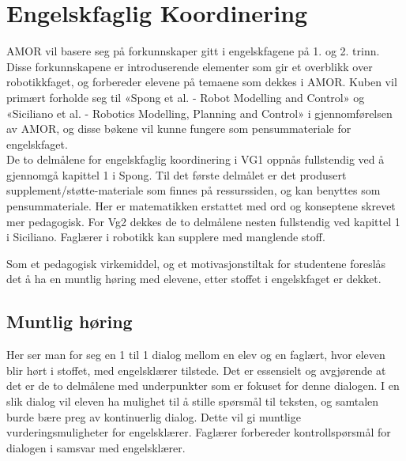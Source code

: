 \section{Engelskfaglig Koordinering} \label{Sec: Engelskfaglig_Koordinering}

AMOR vil basere seg på forkunnskaper gitt i engelskfagene på 1. og 2. trinn.
Disse forkunnskapene er introduserende elementer som gir et overblikk over robotikkfaget, og forbereder elevene på temaene som dekkes i AMOR.
Kuben vil primært forholde seg til «Spong et al. - Robot Modelling and Control» og «Siciliano et al. - Robotics Modelling, Planning and Control» i gjennomførelsen av AMOR, og disse bøkene vil kunne fungere som pensummateriale for engelskfaget.\\
De to delmålene for engelskfaglig koordinering i VG1 oppnås fullstendig ved å gjennomgå kapittel 1 i Spong. Til det første delmålet er det produsert supplement/støtte-materiale som finnes på ressurssiden, og kan benyttes som pensummateriale. Her er matematikken erstattet med ord og konseptene skrevet mer pedagogisk. For Vg2 dekkes de to delmålene nesten fullstendig ved kapittel 1 i Siciliano. Faglærer i robotikk kan supplere med manglende stoff.

Som et pedagogisk virkemiddel, og et motivasjonstiltak for studentene foreslås det å ha en muntlig høring med elevene, etter stoffet i engelskfaget er dekket.

	\subsection{Muntlig høring}
			Her ser man for seg en 1 til 1 dialog mellom en elev og en faglært, hvor eleven blir hørt i stoffet, med engelsklærer tilstede.
			Det er essensielt og avgjørende at det er de to delmålene med underpunkter som er fokuset for denne dialogen.
			I en slik dialog vil eleven ha mulighet til å stille spørsmål til teksten, og samtalen burde bære preg av kontinuerlig dialog.
			Dette vil gi muntlige vurderingsmuligheter for engelsklærer. Faglærer forbereder kontrollspørsmål for dialogen i samsvar med engelsklærer.
